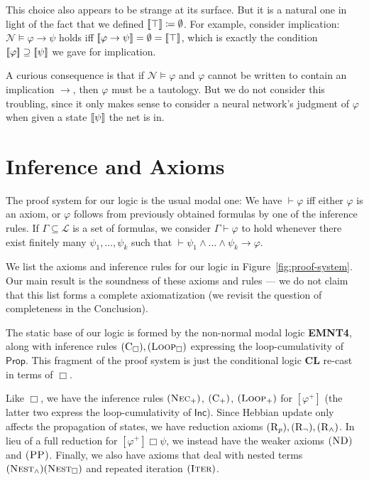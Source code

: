 \documentclass[12pt]{article}
\theoremstyle{definition}
\newcommand{\semantics}[1]{[\![\mbox{\em $ #1 $\/}]\!]}
\newcommand{\proves}{\vdash}
\newcommand{\lang}{\mathcal{L}}
\newcommand{\Prop}{\textsf{Prop}}
\newcommand{\Inc}{\textsf{Inc}}
\newcommand{\Net}{\mathcal{N}}
\newcommand{\axiom}{\textsc}
\begin{document}
This choice also appears to be strange at its surface.  But it is a natural one in light of the fact that we defined $\semantics{\top} \coloneqq \emptyset$.  For example, consider implication: $\Net \models \varphi \to \psi$ holds iff $\semantics{\varphi \to \psi} = \emptyset = \semantics{\top}$, which is exactly the condition $\semantics{\varphi} \supseteq \semantics{\psi}$ we gave for implication.

A curious consequence is that if $\Net \models \varphi$ and $\varphi$ cannot be written to contain an implication $\to$, then $\varphi$ must be a tautology.  But we do not consider this troubling, since it only makes sense to consider a neural network's judgment of $\varphi$ when given a state $\semantics{\psi}$ the net is in.

\section{\textcolor{myblue}{Inference and Axioms}}

The proof system for our logic is the usual modal one: We have $\proves \varphi$ iff either $\varphi$ is an axiom, or $\varphi$ follows from previously obtained formulas by one of the inference rules.  If $\Gamma \subseteq \lang$ is a set of formulas, we consider $\Gamma \proves \varphi$ to hold whenever there exist finitely many $\psi_1, \ldots, \psi_k$ such that $\proves \psi_1 \land \ldots \land \psi_k \to \varphi$.

We list the axioms and inference rules for our logic in Figure~\ref{fig:proof-system}.  Our main result is the soundness of these axioms and rules --- we do not claim that this list forms a complete axiomatization (we revisit the question of completeness in the Conclusion).

The static base of our logic is formed by the non-normal modal logic \textbf{EMNT4}, along with inference rules $(\axiom{C}_\Box), (\axiom{Loop}_\Box)$ expressing the loop-cumulativity of $\Prop$.  This fragment of the proof system is just the conditional logic \textbf{CL} re-cast in terms of $\Box$.

Like $\Box$, we have the inference rules $(\axiom{Nec}_+)$, $(\axiom{C}_+)$, $(\axiom{Loop}_+)$ for $[\varphi^+]$ (the latter two express the loop-cumulativity of $\Inc$).  Since Hebbian update only affects the propagation of states, we have reduction axioms $(\axiom{R}_p), (\axiom{R}_\neg), (\axiom{R}_\land)$.  In lieu of a full reduction for $[\varphi^+] \Box \psi$, we instead have the weaker axioms $\axiom{(ND)}$ and $\axiom{(PP)}$.  Finally, we also have axioms that deal with nested terms $(\axiom{Nest}_\land) (\axiom{Nest}_\Box)$ and repeated iteration $(\axiom{Iter})$.
\end{document}
